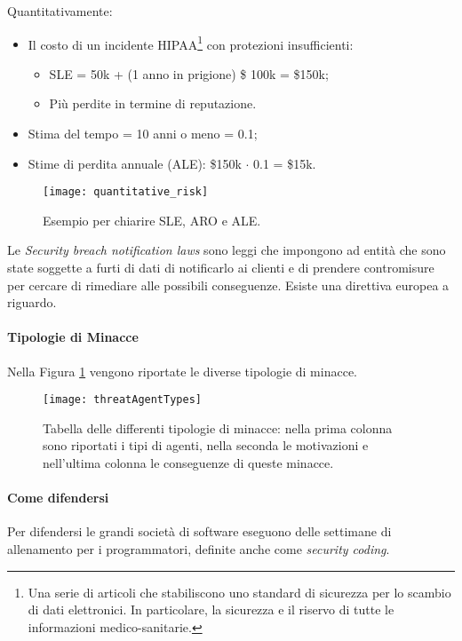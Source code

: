 
Quantitativamente:
\begin{itemize}
\item Il costo di un incidente HIPAA\footnote{Una serie di articoli
che stabiliscono uno standard di sicurezza
per lo scambio di dati elettronici. In particolare, la sicurezza e il
riservo di tutte le informazioni medico-sanitarie.}
con protezioni insufficienti:
\begin{itemize}
 \item SLE = 50k + (1 anno in prigione) \$ 100k = \$150k;
 \item Più perdite in termine di reputazione.
\end{itemize}
\item Stima del tempo = 10 anni o meno = 0.1;
\item Stime di perdita annuale (ALE): \$150k $\cdot$ 0.1 = \$15k.
\end{itemize}


\begin{figure}[H]
 \centering
 \texttt{[image: quantitative\_risk]}
 \caption{Esempio per chiarire SLE, ARO e ALE.}
\end{figure}

Le \textit{Security breach notification laws} sono leggi che impongono ad
entità che sono state soggette a furti di dati di notificarlo ai clienti e di
prendere contromisure per cercare di rimediare alle possibili conseguenze.
Esiste una direttiva europea a riguardo.


\paragraph*{Tipologie di Minacce}
Nella Figura \ref{fig:threat:types} vengono riportate le diverse
tipologie di minacce.
\begin{figure}[H]
 \centering
 \texttt{[image: threatAgentTypes]}
 \caption[Tabella delle differenti tipologie di minacce]{Tabella delle
 differenti tipologie di minacce: nella prima colonna sono riportati
 i tipi di agenti, nella seconda le motivazioni e nell'ultima colonna
 le conseguenze di queste minacce.}
 \label{fig:threat:types}
\end{figure}


\paragraph*{Come difendersi}

Per difendersi le grandi società di software eseguono delle settimane di
allenamento per i programmatori, definite anche come \textit{security coding}.



